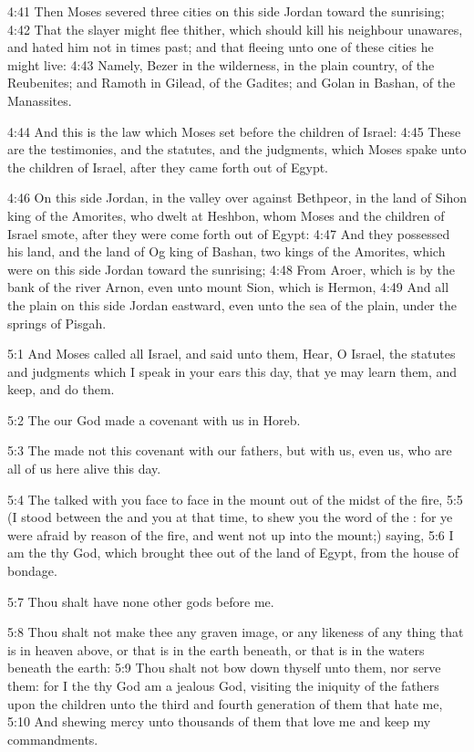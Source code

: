 4:41 Then Moses severed three cities on this side Jordan toward the
sunrising; 4:42 That the slayer might flee thither, which should kill
his neighbour unawares, and hated him not in times past; and that
fleeing unto one of these cities he might live: 4:43 Namely, Bezer in
the wilderness, in the plain country, of the Reubenites; and Ramoth in
Gilead, of the Gadites; and Golan in Bashan, of the Manassites.

4:44 And this is the law which Moses set before the children of
Israel: 4:45 These are the testimonies, and the statutes, and the
judgments, which Moses spake unto the children of Israel, after they
came forth out of Egypt.

4:46 On this side Jordan, in the valley over against Bethpeor, in the
land of Sihon king of the Amorites, who dwelt at Heshbon, whom Moses
and the children of Israel smote, after they were come forth out of
Egypt: 4:47 And they possessed his land, and the land of Og king of
Bashan, two kings of the Amorites, which were on this side Jordan
toward the sunrising; 4:48 From Aroer, which is by the bank of the
river Arnon, even unto mount Sion, which is Hermon, 4:49 And all the
plain on this side Jordan eastward, even unto the sea of the plain,
under the springs of Pisgah.

5:1 And Moses called all Israel, and said unto them, Hear, O Israel,
the statutes and judgments which I speak in your ears this day, that
ye may learn them, and keep, and do them.

5:2 The \LORD our God made a covenant with us in Horeb.

5:3 The \LORD made not this covenant with our fathers, but with us,
even us, who are all of us here alive this day.

5:4 The \LORD talked with you face to face in the mount out of the
midst of the fire, 5:5 (I stood between the \LORD and you at that time,
to shew you the word of the \LORD: for ye were afraid by reason of the
fire, and went not up into the mount;) saying, 5:6 I am the \LORD thy
God, which brought thee out of the land of Egypt, from the house of
bondage.

5:7 Thou shalt have none other gods before me.

5:8 Thou shalt not make thee any graven image, or any likeness of any
thing that is in heaven above, or that is in the earth beneath, or
that is in the waters beneath the earth: 5:9 Thou shalt not bow down
thyself unto them, nor serve them: for I the \LORD thy God am a jealous
God, visiting the iniquity of the fathers upon the children unto the
third and fourth generation of them that hate me, 5:10 And shewing
mercy unto thousands of them that love me and keep my commandments.

